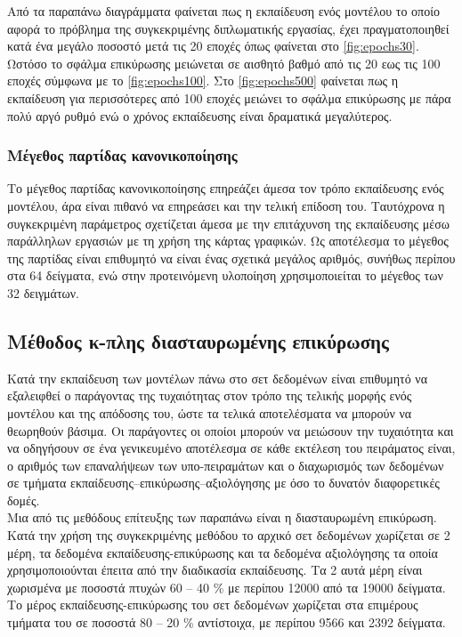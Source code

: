 Από τα παραπάνω διαγράμματα φαίνεται πως η εκπαίδευση ενός μοντέλου το οποίο αφορά το πρόβλημα της συγκεκριμένης διπλωματικής εργασίας, έχει πραγματοποιηθεί κατά ένα μεγάλο ποσοστό μετά τις 20 εποχές όπως φαίνεται στο \ref{fig:epochs30}. Ωστόσο το σφάλμα επικύρωσης μειώνεται σε αισθητό βαθμό από τις 20 εως τις 100 εποχές σύμφωνα με το \ref{fig:epochs100}. Στο \ref{fig:epochs500} φαίνεται πως η εκπαίδευση για περισσότερες από 100 εποχές μειώνει το σφάλμα επικύρωσης με πάρα πολύ αργό ρυθμό ενώ ο χρόνος εκπαίδευσης είναι δραματικά μεγαλύτερος.

\subsubsection{Μέγεθος παρτίδας κανονικοποίησης}
Το μέγεθος παρτίδας κανονικοποίησης επηρεάζει άμεσα τον τρόπο εκπαίδευσης ενός μοντέλου, άρα είναι πιθανό να επηρεάσει και την τελική επίδοση του. Ταυτόχρονα η συγκεκριμένη παράμετρος σχετίζεται άμεσα με την επιτάχυνση της εκπαίδευσης μέσω παράλληλων εργασιών με τη χρήση της κάρτας γραφικών. Ως αποτέλεσμα  το μέγεθος της παρτίδας είναι επιθυμητό να είναι ένας σχετικά μεγάλος αριθμός, συνήθως περίπου στα 64 δείγματα, ενώ στην προτεινόμενη υλοποίηση χρησιμοποιείται το μέγεθος των 32 δειγμάτων.

\subsection{Μέθοδος κ-πλης διασταυρωμένης επικύρωσης}
Κατά την εκπαίδευση των μοντέλων πάνω στο σετ δεδομένων είναι επιθυμητό να εξαλειφθεί ο παράγοντας της τυχαιότητας στον τρόπο της τελικής μορφής ενός μοντέλου και της απόδοσης του, ώστε τα τελικά αποτελέσματα να μπορούν να θεωρηθούν βάσιμα. Οι παράγοντες οι οποίοι μπορούν να μειώσουν την τυχαιότητα και να οδηγήσουν σε ένα γενικευμένο αποτέλεσμα σε κάθε εκτέλεση του πειράματος είναι, ο αριθμός των επαναλήψεων των υπο-πειραμάτων και ο διαχωρισμός των δεδομένων σε τμήματα εκπαίδευσης--επικύρωσης--αξιολόγησης με όσο το δυνατόν διαφορετικές δομές.\\

Μια από τις μεθόδους επίτευξης των παραπάνω είναι η διασταυρωμένη επικύρωση. Κατά την χρήση της συγκεκριμένης μεθόδου το αρχικό σετ δεδομένων χωρίζεται σε 2 μέρη, τα δεδομένα εκπαίδευσης-επικύρωσης και τα δεδομένα αξιολόγησης τα οποία χρησιμοποιούνται έπειτα από την διαδικασία εκπαίδευσης. Τα 2 αυτά μέρη είναι χωρισμένα με ποσοστά πτυχών 60 -- 40 \% με περίπου 12000 από τα 19000 δείγματα. Το μέρος εκπαίδευσης-επικύρωσης του σετ δεδομένων χωρίζεται στα επιμέρους τμήματα του σε ποσοστά 80 -- 20 \% αντίστοιχα, με περίπου 9566 και 2392 δείγματα.\\

